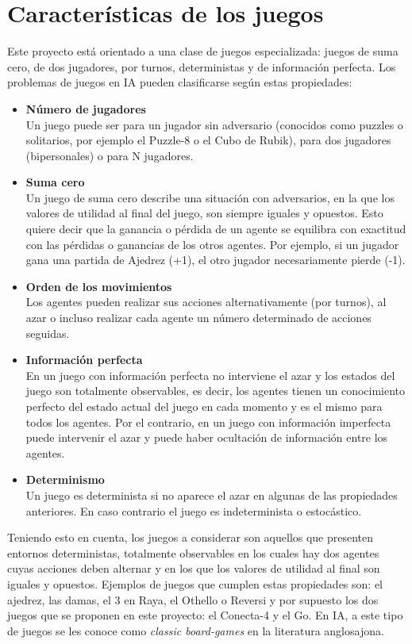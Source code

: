 \section{Características de los juegos}
\label{sec:caracteristicas_juegos}
Este proyecto está orientado a una clase de juegos especializada: juegos de suma cero, de dos jugadores, por turnos, deterministas y de información perfecta.
Los problemas de juegos en IA pueden clasificarse según estas propiedades:
\begin{itemize}
	\item \textbf{Número de jugadores} \\
	Un juego puede ser para un jugador sin adversario (conocidos como puzzles o solitarios, por ejemplo el Puzzle-8 o el Cubo de Rubik), para dos jugadores (bipersonales) o para N jugadores.
	\item \textbf{Suma cero} \\
	Un juego de suma cero describe una situación con adversarios, en la que los valores de utilidad al final del juego, son siempre iguales y opuestos. Esto quiere decir que la ganancia o pérdida de un agente se equilibra con exactitud con las pérdidas o ganancias de los otros agentes.
Por ejemplo, si un jugador gana una partida de Ajedrez (+1), el otro jugador necesariamente pierde (-1).
	\item \textbf{Orden de los movimientos} \\
Los agentes pueden realizar sus acciones alternativamente (por turnos), al azar o incluso realizar cada agente un número determinado de acciones seguidas.
	\item \textbf{Información perfecta} \\
	En un juego con información perfecta no interviene el azar y los estados del juego son totalmente observables, es decir, los agentes tienen un conocimiento perfecto del estado actual del juego en cada momento y es el mismo para todos los agentes.
Por el contrario, en un juego con información imperfecta puede intervenir el azar y puede haber ocultación de información entre los agentes.
	\item \textbf{Determinismo} \\
	Un juego es determinista si no aparece el azar en algunas de las propiedades anteriores.
En caso contrario el juego es indeterminista o estocástico.
\end{itemize}
Teniendo esto en cuenta, los juegos a considerar son aquellos que presenten entornos deterministas, totalmente observables en los cuales hay dos agentes cuyas acciones deben alternar y en los que los valores de utilidad al final son iguales y opuestos.
Ejemplos de juegos que cumplen estas propiedades son: el ajedrez, las damas, el 3 en Raya, el Othello o Reversi y por supuesto los dos juegos que se proponen en este proyecto: el Conecta-4 y el Go.
En IA, a este tipo de juegos se les conoce como \textit{classic board-games} en la literatura anglosajona.

